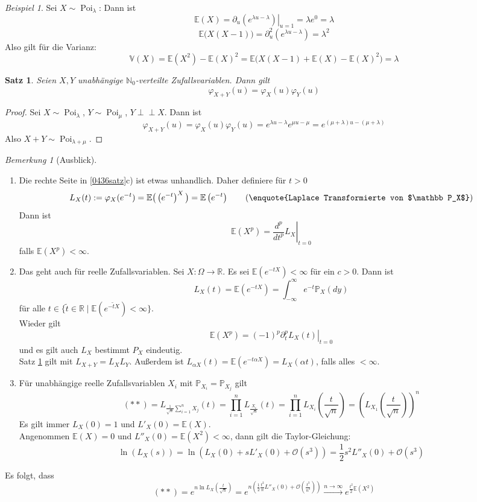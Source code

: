 \documentclass[10pt,a4paper]{article}
\newcommand{\N}{\ensuremath{\mathbb{N}}}
\newcommand{\R}{\ensuremath{\mathbb{R}}}
\newcommand{\la}{\ensuremath{\lambda}}
\newcommand{\al}{\ensuremath{\alpha}}
\newcommand{\indep}{\perp\!\!\!\perp}
\newcommand{\Prb}{\mathbb P}
\newcommand{\Epv}{\ensuremath{\mathbb{E}}}
\newcommand{\Var}{\mathbb{V}}
\newcommand{\scO}{\mathscr O}
\newcommand{\Poi}{\operatorname{Poi}}
\theoremstyle{plain}
\newtheorem{satz}[theorem]{Satz}
\theoremstyle{definition}
\theoremstyle{remark}
\newtheorem{bem}[theorem]{Bemerkung}
\newtheorem{exm}[theorem]{Beispiel}
\begin{document}
	\begin{exm}
		Sei $X\sim\Poi_\la$: Dann ist
		\[\Epv(X)=\left.\partial_u\left(e^{\la u-\la}\right)\right|_{u=1}=\la e^0=\la\]
		\[\Epv\big(X(X-1)\big)=\partial^2_u\left(e^{\la u-\la}\right)=\la^2\]
		Also gilt für die Varianz:
		\[\Var(X)=\Epv(X^2)-\Epv(X)^2=\Epv\big(X(X-1)+\Epv(X)-\Epv(X)^2\big)=\la\]
	\end{exm}

	\begin{satz}\label{0438satz}
		Seien $X,Y$ unabhängige $\N_0$-verteilte Zufallsvariablen. Dann gilt
		\[\varphi_{X+Y}(u)=\varphi_X(u)\varphi_Y(u)\]
	\end{satz}
	\begin{proof}
		Sei $X\sim\Poi_\la$, $Y\sim\Poi_\mu$, $Y\indep X$. Dann ist\[\varphi_{X+Y}(u)=\varphi_X(u)\varphi_Y(u)=e^{\la u-\la}e^{\mu u-\mu}=e^{(\mu+\la)u-(\mu+\la)}\]
		Also $X+Y\sim\Poi_{\la+\mu}$.
	\end{proof}

	\begin{bem}[Ausblick]
		\begin{enumerate}
			\item Die rechte Seite in \ref{0436satz}c) ist etwas unhandlich. Daher definiere für $t>0$
			\[L_X(t):=\varphi_X(e^{-t})=\Epv\big(\left(e^{-t}\right)^X\big)=\Epv\left(e^{-t}\right)\tag{\enquote{Laplace Transformierte von $\Prb_X$}}\]
			Dann ist
			\[\Epv(X^p)=\left.\frac{d^p}{dt^p}L_X\right|_{t=0}\]
			falls $\Epv(X^p)<\infty$.
			\item Das geht auch für reelle Zufallsvariablen. Sei $X:\Omega\to\R$. Es sei $\Epv\left(e^{-tX}\right)<\infty$ für ein $c>0$. Dann ist
			\[L_X(t)=\Epv(e^{-tX})=\int_{-\infty}^{\infty}e^{-t}\Prb_X(dy)\]
			für alle $t\in\{\tilde t\in\R\mid \Epv(e^{-\tilde t X})<\infty\}$.\\
			Wieder gilt
			\[\Epv(X^p)=(-1)^p\left.\partial_t^pL_X(t)\right|_{t=0}\]
			und es gilt auch $L_X$ bestimmt $P_X$ eindeutig.\\
			Satz \ref{0438satz} gilt mit $L_{X+Y}=L_XL_Y$. Außerdem ist $L_{\al X}(t)=\Epv\left(e^{-t\al X}\right)=L_X(\al t)$, falls alles $<\infty$.
			\item Für unabhängige reelle Zufallsvariablen $X_i$ mit $\Prb_{X_i}=\Prb_{X_j}$ gilt
			\[(**)=L_{\frac{1}{\sqrt{n}}\sum_{i=1}^n X_j}(t)=\prod_{i=1}^{n}L_{\frac{X_i}{\sqrt n}}(t)=\prod_{i=1}^nL_{X_i}\left(\frac{t}{\sqrt{ n}}\right)=\left(L_{X_1}\left(\frac{t}{\sqrt{n}}\right)\right)^n\]
			Es gilt immer $L_X(0)=1$ und $L'_X(0)=\Epv(X)$.\\
			Angenommen $\Epv(X)=0$ und $L''_X(0)=\Epv(X^2)<\infty$, dann gilt die Taylor-Gleichung:
			\[\ln(L_X(s))=\ln\left(L_X(0)+sL'_X(0)+\scO(s^3)\right)=\frac{1}{2}s^2L''_X(0)+\scO(s^3)\]
		\end{enumerate}
	Es folgt, dass 
	\[(**)=e^{n\ln L_X\left(\frac{t}{\sqrt{n}}\right)}=e^{n\left(\frac{1}{2}\frac{t^2}{n}L''_X(0)+\scO\left(\frac{t^3}{n^3}\right)\right)}\xrightarrow{n\to\infty}e^{\frac{t^2}{2}\Epv(X^2)}\]
	\end{bem}
\end{document}
